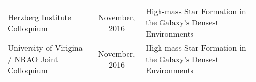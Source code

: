 \begin{minipage}{\textwidth}
\begin{tabular}{p{1.8in}cp{3.5in}}
    Herzberg Institute Colloquium & November, 2016 & High-mass Star Formation in the Galaxy's Densest Environments \\
    University of Virigina / NRAO Joint Colloquium & November, 2016 & High-mass Star Formation in the Galaxy's Densest Environments \\
\end{tabular}
\end{minipage}
\vspace{4mm}
